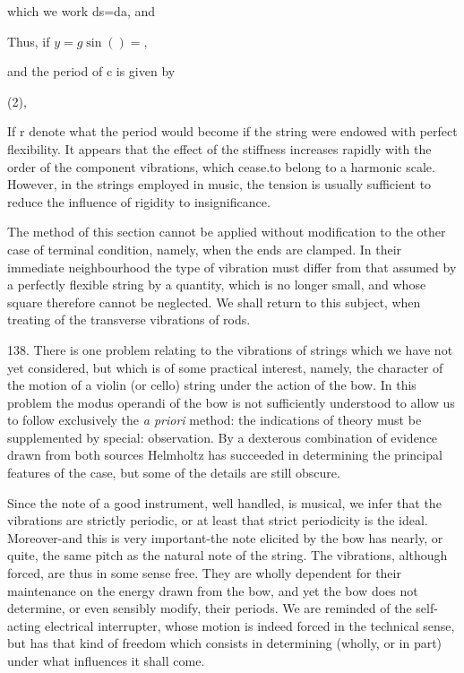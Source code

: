 which we work ds=da, and

Thus, if \(y=g \sin()=,\)

and the period of c is given by

(2),

If r denote what the period would become if the string were endowed with
perfect flexibility. It appears that the effect of the stiffness increases
rapidly with the order of the component vibrations, which cease.to belong to a
harmonic scale. However, in the strings employed in music, the tension is
usually sufficient to reduce the influence of rigidity to insignificance.

The method of this section cannot be applied without modification to the other
case of terminal condition, namely, when the ends are clamped. In their
immediate neighbourhood the type of vibration must differ from that assumed by
a perfectly flexible string by a quantity, which is no longer small, and whose
square therefore cannot be neglected. We shall return to this subject, when
treating of the transverse vibrations of rods.

138. There is one problem relating to the vibrations of strings which we have
not yet considered, but which is of some practical interest, namely, the
character of the motion of a violin (or cello) string under the action of the
bow. In this problem the modus operandi of the bow is not sufficiently
understood to allow us to follow exclusively the \textit{a priori} method: the
indications of theory must be supplemented by special: observation. By a
dexterous combination of evidence drawn from both sources Helmholtz has
succeeded in determining the principal features of the case, but some of the
details are still obscure.

Since the note of a good instrument, well handled, is musical, we infer that
the vibrations are strictly periodic, or at least that strict periodicity is
the ideal. Moreover-and this is very important-the note elicited by the bow has
nearly, or quite, the same pitch as the natural note of the string. The
vibrations, although forced, are thus in some sense free. They are wholly
dependent for their maintenance on the energy drawn from the bow, and yet the
bow does not determine, or even sensibly modify, their periods. We are reminded
of the self-acting electrical interrupter, whose motion is indeed forced in the
technical sense, but has that kind of freedom which consists in determining
(wholly, or in part) under what influences it shall come.


